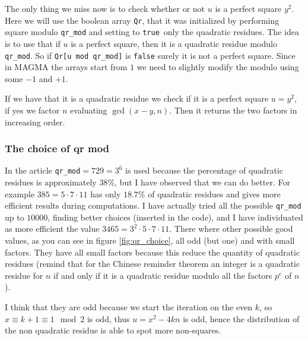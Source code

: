 \documentclass{article}
\theoremstyle{plain}
\theoremstyle{remark}
\theoremstyle{definition}
\begin{document}
The only thing we miss now is to check whether or not $u$ is a perfect square $y^2$. Here we will use the boolean array \texttt{Qr}, 
that it was initialized by performing square modulo \verb|qr_mod| and setting to \texttt{true} only the quadratic residues. 
The idea is to use that if $u$ is a perfect square, then it is a quadratic residue modulo \verb|qr_mod|. 
So if \verb|Qr[u mod qr_mod]| is \texttt{false} surely it is not a perfect square. 
Since in MAGMA the arrays start from $1$ we need to slightly modify the modulo using some $-1$ and $+1$. 

If we have that it is a quadratic residue we check if it is a perfect square $u = y^2$, if yes we factor $n$ evaluating $\gcd(x-y,n)$. Then it returns the two factors in increasing order.

\subsubsection{The choice of qr mod}

In the article \verb|qr_mod|$=729=3^6$ is used because the percentage of quadratic residues is approximately $ 38 \%$, but I have observed that we can do better. For example $385 = 5 \cdot 7 \cdot 11$ has only $18.7 \%$ of quadratic residues and gives more efficient results during computations.  
I have actually tried all the possible \verb|qr_mod| up to $10000$, finding better choices (inserted in the code), and I have individuated as more efficient the value $3465 = 3^2 \cdot 5 \cdot 7 \cdot 11$. There where other possible good values, as you can see in figure \ref{fig:qr_choice}, all odd (but one) and with small factors. 
They have all small factors because this reduce the quantity of quadratic residues (remind that for the Chinese reminder theorem an integer is a quadratic residue for $n$ if and only if it is a quadratic residue modulo all the factors $p^e$ of $n$).

I think that they are odd because we start the iteration on the even $k$, so $x \equiv k+1 \equiv 1 \mod 2$ is odd, thus $u = x^2 - 4kn$ is odd, hence the distribution of the non quadratic residue is able to spot more non-squares. 

\newpage
\printbibliography
\end{document}
